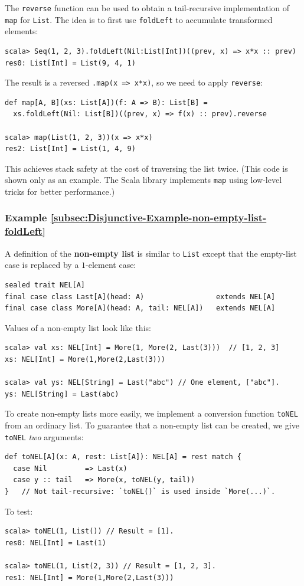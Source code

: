 The \lstinline!reverse! function can be used to obtain a tail-recursive
implementation of \lstinline!map! for \lstinline!List!. The idea
is to first use \lstinline!foldLeft! to accumulate transformed elements:
\begin{lstlisting}
scala> Seq(1, 2, 3).foldLeft(Nil:List[Int])((prev, x) => x*x :: prev)
res0: List[Int] = List(9, 4, 1)
\end{lstlisting}
The result is a reversed \lstinline!.map(x => x*x)!, so we need to
apply \lstinline!reverse!:
\begin{lstlisting}
def map[A, B](xs: List[A])(f: A => B): List[B] =
  xs.foldLeft(Nil: List[B])((prev, x) => f(x) :: prev).reverse

scala> map(List(1, 2, 3))(x => x*x)
res2: List[Int] = List(1, 4, 9)
\end{lstlisting}
This achieves stack safety at the cost of traversing the list twice.
(This code is shown only as an example. The Scala library implements
\lstinline!map! using low-level tricks for better performance.)

\subsubsection{Example \label{subsec:Disjunctive-Example-non-empty-list-foldLeft}\ref{subsec:Disjunctive-Example-non-empty-list-foldLeft}}

A definition of the \textbf{non-empty list}
is similar to \lstinline!List! except that the empty-list case is
replaced by a $1$-element case:
\begin{lstlisting}
sealed trait NEL[A]
final case class Last[A](head: A)                 extends NEL[A]
final case class More[A](head: A, tail: NEL[A])   extends NEL[A]
\end{lstlisting}
Values of a non-empty list look like this:
\begin{lstlisting}
scala> val xs: NEL[Int] = More(1, More(2, Last(3)))  // [1, 2, 3]
xs: NEL[Int] = More(1,More(2,Last(3)))

scala> val ys: NEL[String] = Last("abc") // One element, ["abc"].
ys: NEL[String] = Last(abc)
\end{lstlisting}
To create non-empty lists more easily, we implement a conversion function
\lstinline!toNEL! from an ordinary list. To guarantee that a non-empty
list can be created, we give \lstinline!toNEL! \emph{two} arguments:
\begin{lstlisting}
def toNEL[A](x: A, rest: List[A]): NEL[A] = rest match {
  case Nil         => Last(x)
  case y :: tail   => More(x, toNEL(y, tail))
}   // Not tail-recursive: `toNEL()` is used inside `More(...)`.
\end{lstlisting}
To test:
\begin{lstlisting}
scala> toNEL(1, List()) // Result = [1].
res0: NEL[Int] = Last(1)

scala> toNEL(1, List(2, 3)) // Result = [1, 2, 3].
res1: NEL[Int] = More(1,More(2,Last(3)))
\end{lstlisting}

